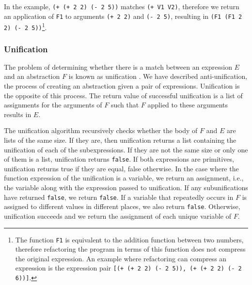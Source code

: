 \documentclass[a4paper,10pt]{article}
\begin{document}
In the example, \texttt{(+ (+ 2 2) (- 2 5))} matches \texttt{(+ V1 V2)}, therefore we return an application of \texttt{F1} to arguments \texttt{(+ 2 2)} and \texttt{(- 2 5)}, resulting in \texttt{(F1 (F1 2 2) (- 2 5))}\footnote{The function \texttt{F1} is equivalent to the addition function between two numbers, therefore refactoring the program in terms of this function does not compress the original expression.  An example where refactoring can compress an expression is the expression pair \texttt{[(+ (+ 2 2) (- 2 5)), (+ (+ 2 2) (- 2 6))]}.}.




\subsubsection{Unification}

The problem of determining whether there is a match between an expression $E$ and an abstraction $F$ is known as unification \cite{Robinson:1965:MLB:321250.321253}. We have described anti-unification, the process of creating an abstraction given a pair of expressions. Unification is the opposite of this process.  The return value of successful unification is a list of assignments for the arguments of $F$ such that $F$ applied to these arguments results in $E$.

The unification algorithm recursively checks whether the body of $F$ and $E$ are lists of the same size.  If they are, then unification returns a list containing the unification of each of the subexpressions.  If they are not the same size or only one of them is a list, unification returns \texttt{false}.  If both expressions are primitives, unification returns true if they are equal, false otherwise.  In the case where the function expression of the unification is a variable, we return an assignment, i.e., the variable along with the expression passed to unification. If any subunifications have returned \texttt{false}, we return \texttt{false}. If a variable that repeatedly occurs in $F$ is assigned to different values in different places, we also return \texttt{false}.
Otherwise, unification succeeds and we return the assignment of each unique variable of $F$.
\end{document}
